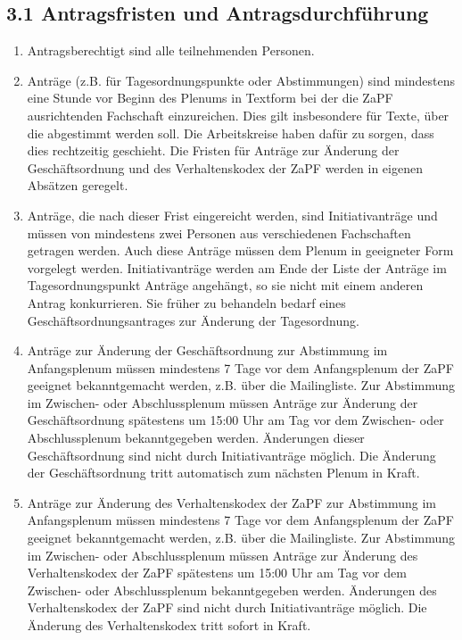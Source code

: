 \documentclass[12pt,oneside]{scrartcl}
\begin{document}
\subsection{3.1 Antragsfristen und Antragsdurchführung%
  \label{antragsfristen-und-antragsdurchfuhrung}%
}

\begin{enumerate}
\item Antragsberechtigt sind alle teilnehmenden Personen.

\item Anträge (z.B. für Tagesordnungspunkte oder Abstimmungen) sind mindestens
eine Stunde vor Beginn des Plenums in Textform bei der die ZaPF
ausrichtenden Fachschaft einzureichen.
Dies gilt insbesondere für Texte, über die abgestimmt werden soll.
Die Arbeitskreise haben dafür zu sorgen, dass dies rechtzeitig geschieht.
Die Fristen für Anträge zur Änderung der Geschäftsordnung und des
Verhaltenskodex der ZaPF werden in eigenen Absätzen geregelt.

\item Anträge, die nach dieser Frist eingereicht werden, sind Initiativanträge
und müssen von mindestens zwei Personen aus verschiedenen Fachschaften
getragen werden.
Auch diese Anträge müssen dem Plenum in geeigneter Form vorgelegt werden.
Initiativanträge werden am Ende der Liste der Anträge im Tagesordnungspunkt
\textquotedbl{}Anträge\textquotedbl{} angehängt, so sie nicht mit einem anderen Antrag konkurrieren.
Sie früher zu behandeln bedarf eines Geschäftsordnungsantrages zur Änderung
der Tagesordnung.

\item Anträge zur Änderung der Geschäftsordnung zur Abstimmung im Anfangsplenum
müssen mindestens 7 Tage vor dem Anfangsplenum der ZaPF geeignet
bekanntgemacht werden, z.B. über die Mailingliste.
Zur Abstimmung im Zwischen- oder Abschlussplenum müssen Anträge zur Änderung
der Geschäftsordnung spätestens um 15:00 Uhr am Tag vor dem Zwischen- oder
Abschlussplenum bekanntgegeben werden.
Änderungen dieser Geschäftsordnung sind nicht durch Initiativanträge möglich.
Die Änderung der Geschäftsordnung tritt automatisch zum nächsten Plenum in Kraft.

\item Anträge zur Änderung des Verhaltenskodex der ZaPF zur Abstimmung im Anfangsplenum
müssen mindestens 7 Tage vor dem Anfangsplenum der ZaPF geeignet
bekanntgemacht werden, z.B. über die Mailingliste.
Zur Abstimmung im Zwischen- oder Abschlussplenum müssen Anträge zur Änderung
des Verhaltenskodex der ZaPF spätestens um 15:00 Uhr am Tag vor dem Zwischen- oder
Abschlussplenum bekanntgegeben werden.
Änderungen des Verhaltenskodex der ZaPF sind nicht durch Initiativanträge möglich.
Die Änderung des Verhaltenskodex tritt sofort in Kraft.


\end{enumerate}
\end{document}
